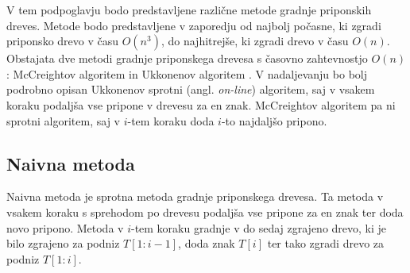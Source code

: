 V tem podpoglavju bodo predstavljene različne metode gradnje priponskih dreves. Metode bodo predstavljene v zaporedju od najbolj počasne, ki zgradi priponsko drevo v času $O(n^3)$, do najhitrejše, ki zgradi drevo v času $O(n)$. Obstajata dve metodi gradnje priponskega drevesa s časovno zahtevnostjo $O(n)$: McCreightov algoritem \cite{McCreight1976} in Ukkonenov algoritem \cite{Ukkonen1995}. V nadaljevanju bo bolj podrobno opisan Ukkonenov sprotni (angl. \textit{on-line}) algoritem, saj v vsakem koraku podaljša vse pripone v drevesu za en znak. McCreightov algoritem pa ni sprotni algoritem, saj v $i$-tem koraku doda $i$-to najdaljšo pripono.

\subsection{Naivna metoda}

Naivna metoda je sprotna metoda gradnje priponskega drevesa.
Ta metoda v vsakem koraku s sprehodom po drevesu podaljša vse pripone za en znak ter doda novo pripono. Metoda v $i$-tem koraku gradnje v do sedaj zgrajeno drevo, ki je bilo zgrajeno za podniz $T[1:i-1]$, doda znak $T[i]$ ter tako zgradi drevo za podniz $T[1:i]$. 

